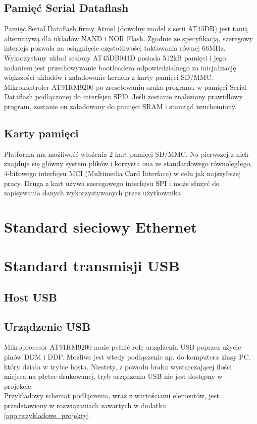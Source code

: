 \documentclass[a4paper,12pt]{book}
\begin{document}
			\subsection{Pamięć Serial Dataflash}
				Pamięć Serial Dataflash firmy Atmel (dowolny model z serii AT45DB) jest tanią alternatywą dla układów NAND i NOR Flash. Zgodnie ze specyfikacją, szeregowy interfejs pozwala na osiągnięcie częstotliwości taktowania równej 66MHz.\\
				Wykorzystany układ scalony AT45DB041D posiada 512kB pamięci i jego zadaniem jest przechowywanie bootloadera odpowiedzialnego za inicjalizację większości układów i załadowanie kernela z karty pamięci SD/MMC.\\
				Mikrokontroler AT91RM9200 po zresetowaniu szuka programu w pamięci Serial Dataflash podłączonej do interfejsu SPI0. Jeśli zostanie znaleziony prawidłowy program, zostanie on załadowany do pamięci SRAM i stamtąd uruchomiony.
			\subsection{Karty pamięci}
				Platforma ma możliwość włożenia 2 kart pamięci SD/MMC. Na pierwszej z nich znajduje się główny system plików i korzysta ona ze standardowego równoległego, 4-bitowego interfejsu MCI (Multimedia Card Interface) w celu jak najszybszej pracy. Druga z kart używa szeregowego interfejsu SPI i może służyć do zapisywania danych wykorzystywanych przez użytkownika.
		\section{Standard sieciowy Ethernet}
		\section{Standard transmisji USB}
			\subsection{Host USB}
			
			\subsection{Urządzenie USB}Mikroprocesor AT91RM9200 może pełnić rolę urządzenia USB poprzez użycie pinów DDM i DDP. Możliwe jest wtedy podłączenie np. do komputera klasy PC, który działa w trybie hosta. Niestety, z powodu braku wystarczającej ilości miejsca na płytce drukowanej, tryb urządzenia USB nie jest dostępny w projekcie.\\
			Przykładowy schemat podłączenia, wraz z wartościami elementów, jest przedstawiony w rozwiązaniach zawartych w dodatku \ref{app:przykladowe_projekty}.
			
\end{document}
